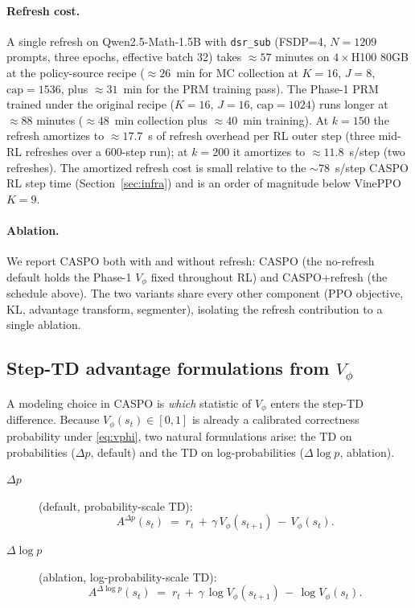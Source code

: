 \documentclass[11pt]{article}
\newcommand{\caspo}{\textsc{CASPO}}
\newcommand{\vineppo}{VinePPO}
\begin{document}
\paragraph{Refresh cost.}
A single refresh on Qwen2.5-Math-1.5B with \texttt{dsr\_sub} (FSDP=4,
$N{=}1209$ prompts, three epochs, effective batch 32) takes
$\approx 57$ minutes on $4{\times}$H100 80GB at the policy-source
recipe ($\approx 26$~min for MC collection at $K{=}16$, $J{=}8$,
$\mathrm{cap}{=}1536$, plus $\approx 31$~min for the PRM training
pass). The Phase-1 PRM trained under the original recipe
($K{=}16$, $J{=}16$, $\mathrm{cap}{=}1024$) runs longer at
$\approx 88$ minutes ($\approx 48$~min collection plus
$\approx 40$~min training). At $k{=}150$ the refresh amortizes to
${\approx}17.7$~s of refresh overhead per RL outer step (three
mid-RL refreshes over a 600-step run); at $k{=}200$ it amortizes to
${\approx}11.8$~s/step (two refreshes). The amortized refresh cost
is small relative to the ${\sim}78$~s/step CASPO RL step time
(Section~\ref{sec:infra}) and is an order of magnitude below
\vineppo{}~$K{=}9$.

\paragraph{Ablation.}
We report \caspo{} both with and without refresh: \caspo{} (the
no-refresh default holds the Phase-1 $V_\phi$ fixed throughout RL)
and \caspo{}+refresh (the schedule above). The two variants share
every other component (PPO objective, KL, advantage transform,
segmenter), isolating the refresh contribution to a single ablation.

\subsection{Step-TD advantage formulations from $V_\phi$}
\label{sec:transforms}

A modeling choice in \caspo{} is \emph{which} statistic of $V_\phi$
enters the step-TD difference. Because $V_\phi(s_t) \in [0, 1]$ is
already a calibrated correctness probability under \eqref{eq:vphi},
two natural formulations arise: the TD on probabilities ($\Delta p$,
default) and the TD on log-probabilities ($\Delta\log p$, ablation).

\begin{description}
\item[$\Delta p$] (default, probability-scale TD):
\begin{equation}
\label{eq:advP}
A^{\Delta p}(s_t) \;=\; r_t \,+\, \gamma\, V_\phi(s_{t+1}) \,-\, V_\phi(s_t).
\end{equation}
\item[$\Delta\log p$] (ablation, log-probability-scale TD):
\begin{equation}
\label{eq:advLP}
A^{\Delta\log p}(s_t) \;=\; r_t \,+\, \gamma\, \log V_\phi(s_{t+1}) \,-\, \log V_\phi(s_t).
\end{equation}
\end{description}
\end{document}
